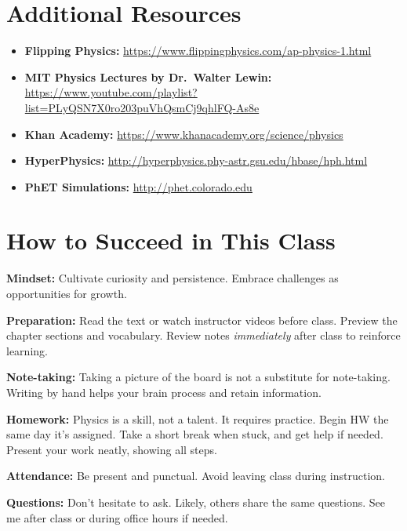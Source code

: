 \documentclass[12pt]{article}
\begin{document}
\newpage

\section*{Additional Resources}
\begin{itemize}[leftmargin=2em]
  \item \textbf{Flipping Physics:} \url{https://www.flippingphysics.com/ap-physics-1.html}
  \item \textbf{MIT Physics Lectures by Dr.~Walter Lewin:} \url{https://www.youtube.com/playlist?list=PLyQSN7X0ro203puVhQsmCj9qhlFQ-As8e}
  \item \textbf{Khan Academy:} \url{https://www.khanacademy.org/science/physics}
  \item \textbf{HyperPhysics:} \url{http://hyperphysics.phy-astr.gsu.edu/hbase/hph.html}
  \item \textbf{PhET Simulations:} \url{http://phet.colorado.edu}
\end{itemize}

\section*{How to Succeed in This Class}
\noindent
\textbf{Mindset:} Cultivate curiosity and persistence. Embrace challenges as opportunities for growth.

\noindent
\textbf{Preparation:} Read the text or watch instructor videos before class. Preview the chapter sections and vocabulary. Review notes \emph{immediately} after class to reinforce learning.

\noindent
\textbf{Note-taking:} Taking a picture of the board is not a substitute for note-taking. Writing by hand helps your brain process and retain information.

\noindent
\textbf{Homework:} Physics is a skill, not a talent. It requires practice. Begin HW the same day it’s assigned. Take a short break when stuck, and get help if needed. Present your work neatly, showing all steps.

\noindent
\textbf{Attendance:} Be present and punctual. Avoid leaving class during instruction.

\noindent
\textbf{Questions:} Don’t hesitate to ask. Likely, others share the same questions. See me after class or during office hours if needed.
\end{document}

